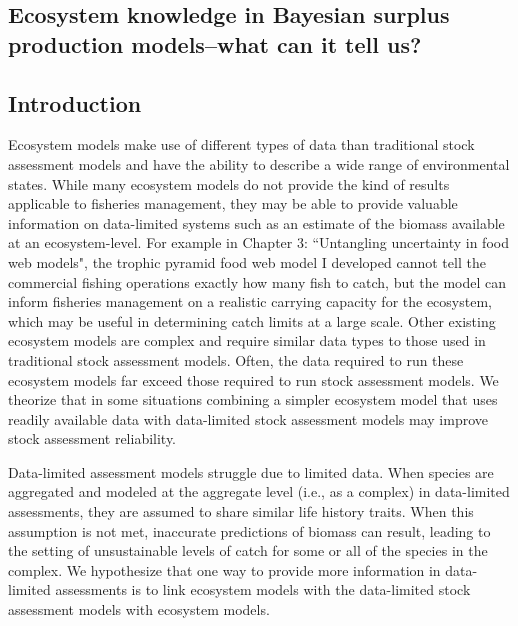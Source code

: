 \documentclass[oneside,12pt,final]{sty/ucthesis-CA2012}
\begin{document}
\begin{mainmatter}
\chapter{Ecosystem knowledge in Bayesian surplus production models--what can it tell us?}

\section{Introduction}
Ecosystem models make use of different types of data than traditional stock assessment models and have the ability to describe a wide range of environmental states. While many ecosystem models do not provide the kind of results applicable to fisheries management, they may be able to provide valuable information on data-limited systems such as an estimate of the biomass available at an ecosystem-level. For example in Chapter 3: ``Untangling uncertainty in food web models", the trophic pyramid food web model I developed cannot tell the commercial fishing operations exactly how many fish to catch, but the model can inform fisheries management on a realistic carrying capacity for the ecosystem, which may be useful in determining catch limits at a large scale. Other existing ecosystem models are complex and require similar data types to those used in traditional stock assessment models. Often, the data required to run these ecosystem models far exceed those required to run stock assessment models. We theorize that in some situations combining a simpler ecosystem model that uses readily available data with data-limited stock assessment models may improve stock assessment reliability. 

\vspace{5mm}

Data-limited assessment models struggle due to limited data. When species are aggregated and modeled at the aggregate level (i.e., as a complex) in data-limited assessments, they are assumed to share similar life history traits. When this assumption is not met, inaccurate predictions of biomass can result, leading to the setting of unsustainable levels of catch for some or all of the species in the complex. We hypothesize that one way to provide more information in data-limited assessments is to link ecosystem models with the data-limited stock assessment models with ecosystem models. 

\vspace{5mm}


\end{mainmatter}
\end{document}
